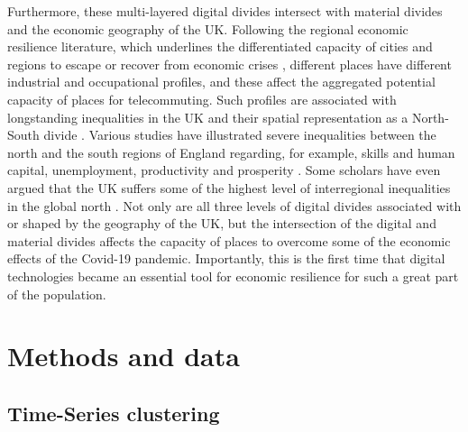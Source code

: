 \documentclass[Royal,times,sageh]{sagej}
\begin{document}
Furthermore, these multi-layered digital divides intersect with material
divides and the economic geography of the UK. Following the regional
economic resilience literature, which underlines the differentiated
capacity of cities and regions to escape or recover from economic crises
\citep{martin2012regional, kitsos2018economic}, different places have
different industrial and occupational profiles, and these affect the
aggregated potential capacity of places for telecommuting. Such profiles
are associated with longstanding inequalities in the UK and their
spatial representation as a North-South divide
\citep{martin_north_south}. Various studies have illustrated severe
inequalities between the north and the south regions of England
regarding, for example, skills and human capital, unemployment,
productivity and prosperity
\citep{lee2014grim, mccann2020perceptions, dorling2018peak}. Some
scholars have even argued that the UK suffers some of the highest level
of interregional inequalities in the global north
\citep{gal2018reducing, mccann2016uk}. Not only are all three levels of
digital divides associated with or shaped by the geography of the UK,
but the intersection of the digital and material divides affects the
capacity of places to overcome some of the economic effects of the
Covid-19 pandemic. Importantly, this is the first time that digital
technologies became an essential tool for economic resilience for such a
great part of the population.

\hypertarget{sec:3}{%
\section{Methods and data}\label{sec:3}}

\hypertarget{sec:3.1}{%
\subsection{Time-Series clustering}\label{sec:3.1}}
\end{document}
